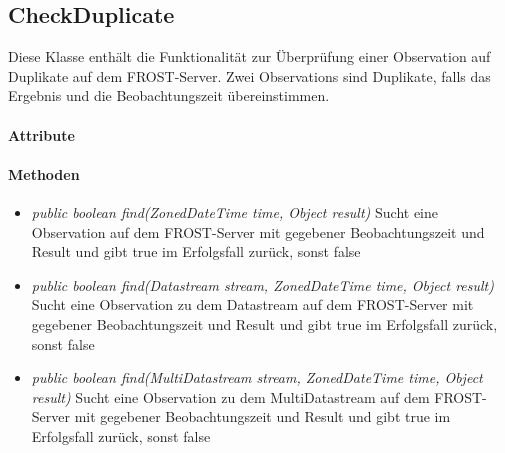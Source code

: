 \subsection{CheckDuplicate}

Diese Klasse enthält die Funktionalität zur Überprüfung einer Observation auf Duplikate auf dem FROST-Server.
Zwei Observations sind Duplikate, falls das Ergebnis und die Beobachtungszeit übereinstimmen.

\paragraph{Attribute}

\paragraph{Methoden}
\begin{itemize}
\item \textit{public boolean find(ZonedDateTime time, Object result)} Sucht eine Observation auf dem FROST-Server mit gegebener Beobachtungszeit und Result und gibt true im Erfolgsfall zurück, sonst false
\item \textit{public boolean find(Datastream stream, ZonedDateTime time, Object result)} Sucht eine Observation zu dem Datastream auf dem FROST-Server mit gegebener Beobachtungszeit und Result und gibt true im Erfolgsfall zurück, sonst false
\item \textit{public boolean find(MultiDatastream stream, ZonedDateTime time, Object result)} Sucht eine Observation zu dem MultiDatastream auf dem FROST-Server mit gegebener Beobachtungszeit und Result und gibt true im Erfolgsfall zurück, sonst false
\end{itemize}